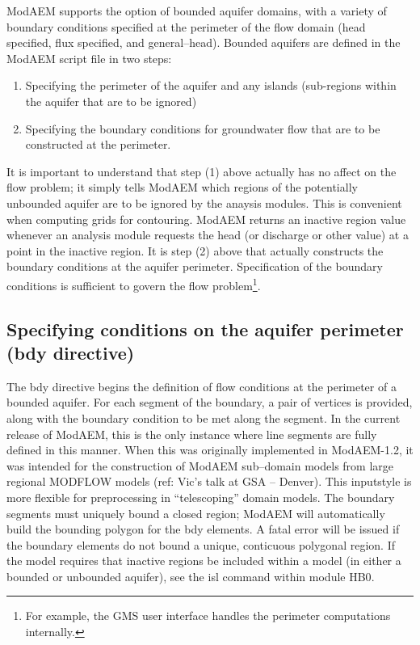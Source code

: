 ModAEM supports the option of bounded aquifer domains, with a variety of boundary conditions specified at the perimeter of the flow domain (head specified, flux specified, and general--head). Bounded aquifers are defined in the ModAEM script file in two steps:
\begin{enumerate}
\item Specifying the perimeter of the aquifer and any islands (sub-regions within the aquifer that are to be ignored) 
\item Specifying the boundary conditions for groundwater flow that are to be constructed at the perimeter.
\end{enumerate}
It is important to understand that step (1) above actually has no affect on the flow problem; it simply tells ModAEM which regions of the potentially unbounded aquifer are to be ignored by the anaysis modules. This is convenient when computing grids for contouring. ModAEM returns an inactive region value whenever an analysis module requests the head (or discharge or other value) at a point in the inactive region. It is step (2) above that actually constructs the boundary conditions at the aquifer perimeter. Specification of the boundary conditions is sufficient to govern the flow problem\footnote{For example, the GMS user interface handles the perimeter computations internally.}.

\subsection{Specifying conditions on the aquifer perimeter (\textsf{bdy} directive) }

The \textsf{bdy} directive begins the definition of flow conditions at the perimeter of a bounded aquifer. For each segment of the boundary, a pair of vertices is provided, along with the boundary condition to be met along the segment. In the current release of ModAEM, this is the only instance where line segments are fully defined in this manner. When this was originally implemented in ModAEM-1.2, it was intended for the construction of ModAEM sub--domain models from large regional MODFLOW models (ref: Vic's talk at GSA -- Denver). This inputstyle is more flexible for preprocessing in ``telescoping'' domain models. The boundary segments must uniquely bound a closed region; ModAEM will automatically build the bounding polygon for the \textsf{bdy} elements. A fatal error will be issued if the boundary elements do not bound a unique, conticuous polygonal region. If the model requires that inactive regions be included within a model (in either a bounded or unbounded aquifer), see the \textsf{isl} command within module \textsf{HB0}.
